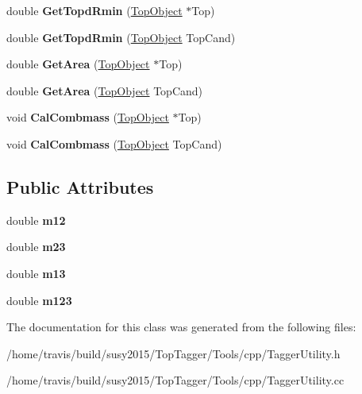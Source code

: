 \begin{DoxyCompactItemize}
\item 
\hypertarget{classTopVar_ae43a16b09234d8ca747e0b461016672c}{double {\bfseries Get\-Topd\-Rmin} (\hyperlink{classTopObject}{Top\-Object} $\ast$Top)}\label{classTopVar_ae43a16b09234d8ca747e0b461016672c}

\item 
\hypertarget{classTopVar_a5b5c3084912a2cc8b80cb0ecb98bfe2d}{double {\bfseries Get\-Topd\-Rmin} (\hyperlink{classTopObject}{Top\-Object} Top\-Cand)}\label{classTopVar_a5b5c3084912a2cc8b80cb0ecb98bfe2d}

\item 
\hypertarget{classTopVar_a6a42811b115277399019430d4321d00e}{double {\bfseries Get\-Area} (\hyperlink{classTopObject}{Top\-Object} $\ast$Top)}\label{classTopVar_a6a42811b115277399019430d4321d00e}

\item 
\hypertarget{classTopVar_a0db4a4964fed572f7a3859583c4c1836}{double {\bfseries Get\-Area} (\hyperlink{classTopObject}{Top\-Object} Top\-Cand)}\label{classTopVar_a0db4a4964fed572f7a3859583c4c1836}

\item 
\hypertarget{classTopVar_a1752f1672092a87601d43437c62c32bf}{void {\bfseries Cal\-Combmass} (\hyperlink{classTopObject}{Top\-Object} $\ast$Top)}\label{classTopVar_a1752f1672092a87601d43437c62c32bf}

\item 
\hypertarget{classTopVar_a9c014c9ae6ba903f5895f4c1b15d6a51}{void {\bfseries Cal\-Combmass} (\hyperlink{classTopObject}{Top\-Object} Top\-Cand)}\label{classTopVar_a9c014c9ae6ba903f5895f4c1b15d6a51}

\end{DoxyCompactItemize}
\subsection*{Public Attributes}
\begin{DoxyCompactItemize}
\item 
\hypertarget{classTopVar_ae22898701409ccbde027789fede272a9}{double {\bfseries m12}}\label{classTopVar_ae22898701409ccbde027789fede272a9}

\item 
\hypertarget{classTopVar_a60e6dac821e4072afa48f5232206334d}{double {\bfseries m23}}\label{classTopVar_a60e6dac821e4072afa48f5232206334d}

\item 
\hypertarget{classTopVar_aa559866cddb77de89eda21178e83c83e}{double {\bfseries m13}}\label{classTopVar_aa559866cddb77de89eda21178e83c83e}

\item 
\hypertarget{classTopVar_a8e038da72659f1bf831c463e3fffe902}{double {\bfseries m123}}\label{classTopVar_a8e038da72659f1bf831c463e3fffe902}

\end{DoxyCompactItemize}


The documentation for this class was generated from the following files\-:\begin{DoxyCompactItemize}
\item 
/home/travis/build/susy2015/\-Top\-Tagger/\-Tools/cpp/Tagger\-Utility.\-h\item 
/home/travis/build/susy2015/\-Top\-Tagger/\-Tools/cpp/Tagger\-Utility.\-cc\end{DoxyCompactItemize}
